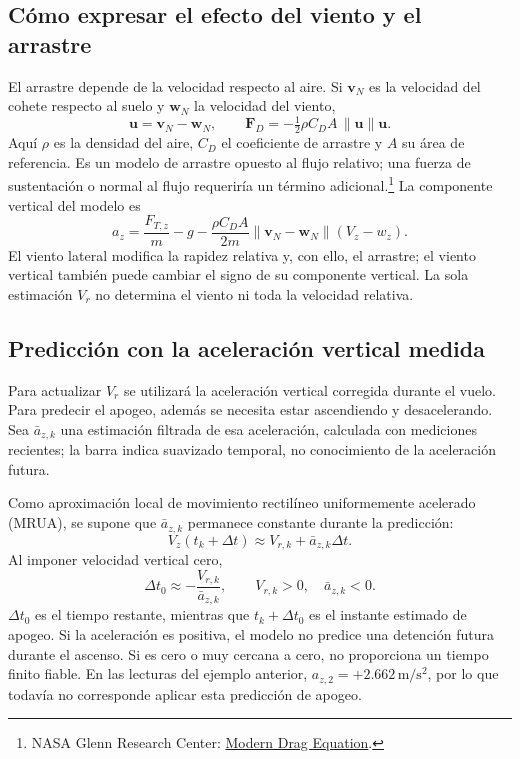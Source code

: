\subsection{Cómo expresar el efecto del viento y el arrastre}
El arrastre depende de la velocidad respecto al aire. Si $\mathbf v_N$ es la velocidad del cohete respecto al suelo y $\mathbf w_N$ la velocidad del viento,
\begin{equation}
 \mathbf u=\mathbf v_N-\mathbf w_N,\qquad
 \mathbf F_D=-\tfrac12\rho C_D A\,\|\mathbf u\|\mathbf u.
\end{equation}
Aquí $\rho$ es la densidad del aire, $C_D$ el coeficiente de arrastre y $A$ su área de referencia. Es un modelo de arrastre opuesto al flujo relativo; una fuerza de sustentación o normal al flujo requeriría un término adicional.\footnote{NASA Glenn Research Center: \href{https://www1.grc.nasa.gov/beginners-guide-to-aeronautics/modern-drag-equation/}{Modern Drag Equation}.}
La componente vertical del modelo es
\begin{equation}
 a_z=\frac{F_{T,z}}{m}-g-
 \frac{\rho C_D A}{2m}\|\mathbf v_N-\mathbf w_N\|(V_z-w_z).
\end{equation}
El viento lateral modifica la rapidez relativa y, con ello, el arrastre; el viento vertical también puede cambiar el signo de su componente vertical. La sola estimación $V_r$ no determina el viento ni toda la velocidad relativa.

\newpage
\subsection{Predicción con la aceleración vertical medida}
Para actualizar $V_r$ se utilizará la aceleración vertical corregida durante el vuelo. Para predecir el apogeo, además se necesita estar ascendiendo y desacelerando. Sea $\bar a_{z,k}$ una estimación filtrada de esa aceleración, calculada con mediciones recientes; la barra indica suavizado temporal, no conocimiento de la aceleración futura.

Como aproximación local de movimiento rectilíneo uniformemente acelerado (MRUA), se supone que $\bar a_{z,k}$ permanece constante durante la predicción:
\begin{equation}
 V_z(t_k+\Delta t)\approx V_{r,k}+\bar a_{z,k}\Delta t.
\end{equation}
Al imponer velocidad vertical cero,
\begin{equation}
 \boxed{\Delta t_0\approx-\frac{V_{r,k}}{\bar a_{z,k}}},
 \qquad V_{r,k}>0,\quad \bar a_{z,k}<0.
\end{equation}
$\Delta t_0$ es el tiempo restante, mientras que $t_k+\Delta t_0$ es el instante estimado de apogeo. Si la aceleración es positiva, el modelo no predice una detención futura durante el ascenso. Si es cero o muy cercana a cero, no proporciona un tiempo finito fiable. En las lecturas del ejemplo anterior, $a_{z,2}=+2.662\,\mathrm{m/s^2}$, por lo que todavía no corresponde aplicar esta predicción de apogeo.

